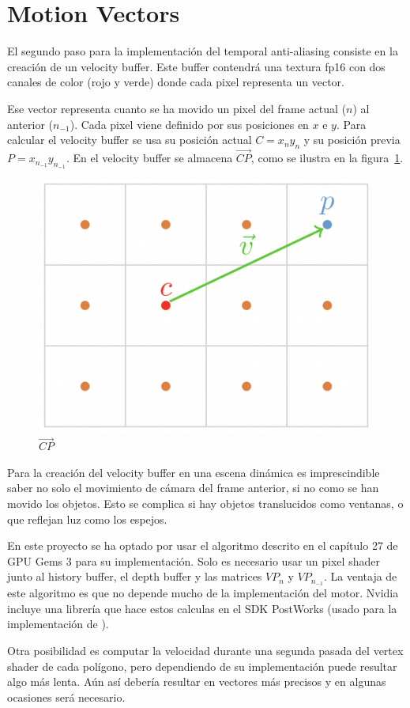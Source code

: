 \documentclass[withindex, glossary]{cam-thesis}
\begin{document}
\section{Motion Vectors}

El segundo paso para la implementación del temporal anti-aliasing consiste en la creación de un velocity buffer. Este buffer contendrá una textura fp16 con dos canales de color (rojo y verde) donde cada pixel representa un vector.

Ese vector representa cuanto se ha movido un pixel del frame actual ($n$) al anterior ($n_{-1}$). Cada pixel viene definido por sus posiciones en $x$ e $y$. Para calcular el velocity buffer se usa su posición actual $C = x_{n}y_{n}$ y su posición previa $P = x_{n_{-1}}y_{n_{-1}}$. En el velocity buffer se almacena $\vec{CP}$, como se ilustra en la figura~\ref{vec}.

\begin{figure}[!htbp]
    \includegraphics[width=.5\linewidth]{figures/vec.png}
    \caption{$\vec{CP}$\cite{filmicsmaa}\label{vec}}
\end{figure}

Para la creación del velocity buffer en una escena dinámica es imprescindible saber no solo el movimiento de cámara del frame anterior, si no como se han movido los objetos. Esto se complica si hay objetos translucidos como ventanas, o que reflejan luz como los espejos\cite{uncharted4}.

En este proyecto se ha optado por usar el algoritmo descrito en el capítulo 27 de GPU Gems 3\cite{Nguyen:2007:GG:1407436} para su implementación. Solo es necesario usar un pixel shader junto al history buffer, el depth buffer y las matrices $VP_{n}$ y $VP_{n_{-1}}$. La ventaja de este algoritmo es que no depende mucho de la implementación del motor. Nvidia incluye una librería que hace estos calculas en el SDK PostWorks\cite{postworks} (usado para la implementación de ).

Otra posibilidad es computar la velocidad durante una segunda pasada del vertex shader de cada polígono, pero dependiendo de su implementación puede resultar algo más lenta. Aún así debería resultar en vectores más precisos y en algunas ocasiones será necesario\cite{asscreed}.
\end{document}
